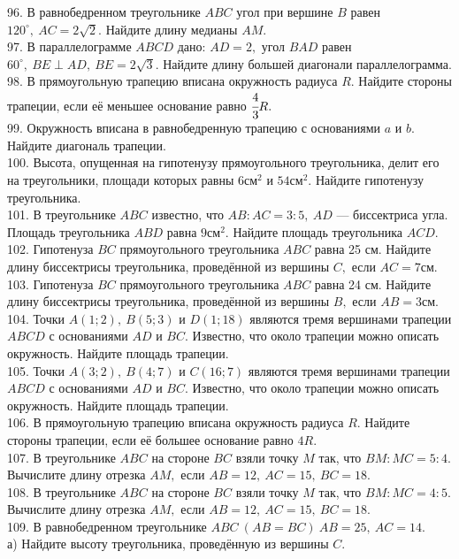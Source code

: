 \documentclass[12pt]{article}
\begin{document}
96. В равнобедренном треугольнике $ABC$ угол при вершине $B$ равен $120^\circ,\ AC=2\sqrt{2}.$ Найдите длину медианы $AM.$\\
97. В параллелограмме $ABCD$ дано: $AD=2,$ угол $BAD$ равен $60^\circ,\ BE\perp AD,\ BE=2\sqrt{3}.$ Найдите длину большей диагонали параллелограмма.\\
98. В прямоугольную трапецию вписана окружность радиуса $R.$ Найдите стороны трапеции, если её меньшее основание равно $\cfrac{4}{3}R.$\\
99. Окружность вписана в равнобедренную трапецию с основаниями  $a$ и $b.$ Найдите диагональ трапеции.\\
100. Высота, опущенная на гипотенузу прямоугольного треугольника, делит его на треугольники, площади которых равны $6\text{см}^2$ и $54\text{см}^2.$ Найдите гипотенузу треугольника.\\
101. В треугольнике $ABC$ известно, что $AB:AC=3:5,\ AD$ --- биссектриса угла. Площадь треугольника $ABD$ равна $9\text{см}^2.$ Найдите площадь треугольника $ACD.$\\
102. Гипотенуза $BC$ прямоугольного треугольника $ABC$ равна 25 см. Найдите длину биссектрисы треугольника, проведённой из вершины $C,$ если $AC=7$см.\\
103. Гипотенуза $BC$ прямоугольного треугольника $ABC$ равна 24 см. Найдите длину биссектрисы треугольника, проведённой из вершины $B,$ если $AB=3$см.\\
104. Точки $A(1;2),\ B(5;3)$ и $D(1;18)$ являются тремя вершинами трапеции
$ABCD$ с основаниями $AD$ и $BC.$ Известно, что около трапеции можно описать окружность. Найдите площадь трапеции.\\
105. Точки $A(3;2),\ B(4;7)$ и $C(16;7)$ являются тремя вершинами трапеции
$ABCD$ с основаниями $AD$ и $BC.$ Известно, что около трапеции можно описать окружность. Найдите площадь трапеции.\\
106. В прямоугольную трапецию вписана окружность радиуса $R.$ Найдите стороны трапеции, если её большее основание равно $4R.$\\
107. В треугольнике $ABC$ на стороне $BC$ взяли точку $M$ так, что $BM:MC=5:4.$ Вычислите длину отрезка $AM,$ если $AB=12,\ AC=15,\ BC=18.$\\
108. В треугольнике $ABC$ на стороне $BC$ взяли точку $M$ так, что $BM:MC=4:5.$ Вычислите длину отрезка $AM,$ если $AB=12,\ AC=15,\ BC=18.$\\
109. В равнобедренном треугольнике $ABC\ (AB=BC)\ AB=25,\ AC=14.$\\
а) Найдите высоту треугольника, проведённую из вершины $C.$\\
\end{document}
